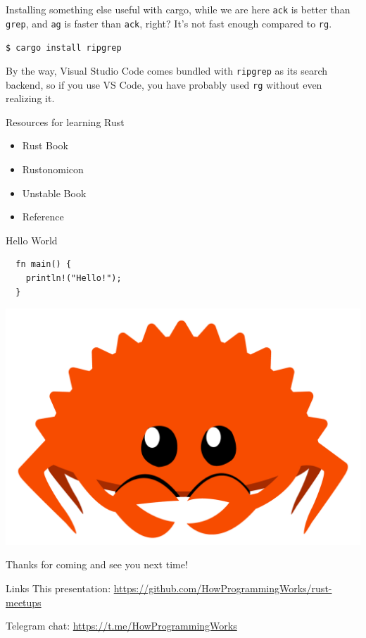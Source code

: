 \documentclass[12pt, aspectratio=169]{beamer}
\newcommand{\ferrisframe}[1]{%
  \begin{frame}[standout]
    \includegraphics[height=0.8\textheight]{images/ferris.png}

    #1
  \end{frame}
}
\begin{document}
\begin{frame}{Installing something else useful with cargo, while we are here}
  \texttt{ack} is better than \texttt{grep}, and \texttt{ag} is faster than
  \texttt{ack}, right? It's not fast enough compared to \texttt{rg}.

  \texttt{\$ cargo install ripgrep}

  By the way, Visual Studio Code comes bundled with \texttt{ripgrep} as its
  search backend, so if you use VS Code, you have probably used \texttt{rg}
  without even realizing it.
\end{frame}

\begin{frame}{Resources for learning Rust}
  \begin{itemize}
    \item Rust Book 
    \item Rustonomicon 
    \item Unstable Book 
    \item Reference 
  \end{itemize}
\end{frame}

\begin{frame}[fragile]{Hello World}
  \begin{verbatim}
  fn main() {
    println!("Hello!");
  }
  \end{verbatim}
\end{frame}

\ferrisframe{Thanks for coming and see you next time!}

\begin{frame}{Links}
  This presentation: \url{https://github.com/HowProgrammingWorks/rust-meetups}

  Telegram chat: \url{https://t.me/HowProgrammingWorks}
\end{frame}
\end{document}
